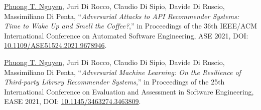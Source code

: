 \documentclass[a4paper,9pt]{article} %
\begin{document}
\begin{thebibliography}{100}
	
	
	
	
	\underline{Phuong T. Nguyen}, Juri Di Rocco, Claudio Di Sipio, Davide Di Ruscio, Massimiliano Di Penta, ``\emph{Adversarial Attacks to API Recommender Systems: Time to Wake Up and Smell the Coffee?},'' in Proceedings %
	of the 36th IEEE/ACM International Conference on Automated Software Engineering, ASE 2021, DOI: \href{https://doi.org/10.1109/ASE51524.2021.9678946}{10.1109/ASE51524.2021.9678946}.%
		
	\underline{Phuong T. Nguyen}, Juri Di Rocco, Claudio Di Sipio, Davide Di Ruscio, Massimiliano Di Penta, ``\emph{Adversarial Machine Learning: On the Resilience of Third-party Library Recommender Systems},'' in Proceedings of the 25th International Conference on Evaluation and Assessment in Software Engineering, EASE 2021, DOI: \href{https://doi.org/10.1145/3463274.3463809}{10.1145/3463274.3463809}.
	
%	
%		
		

\end{thebibliography}
\end{document}
